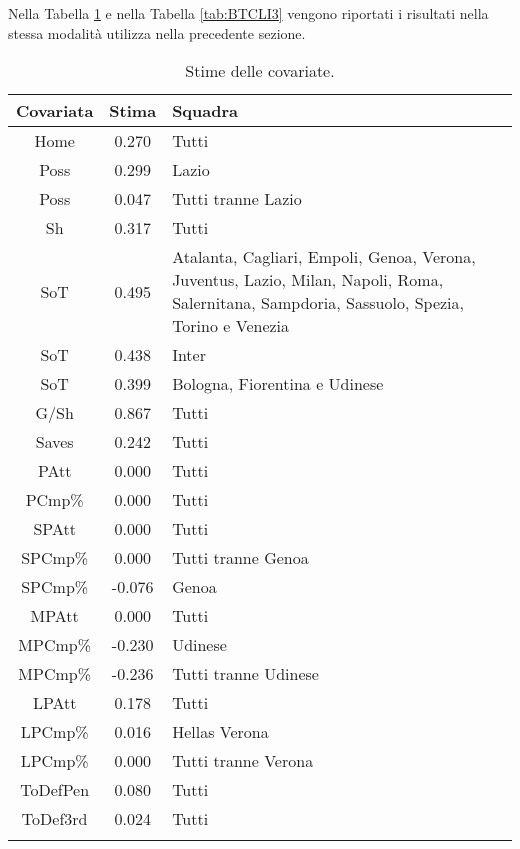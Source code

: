 Nella Tabella \ref{tab:BTCLI2} e nella Tabella \ref{tab:BTCLI3} vengono riportati i risultati nella stessa modalità utilizza nella precedente sezione.
\begin{table}[]%
	
	\renewcommand{\arraystretch}{1.7}
	\centering
	\begin{tabular}{ccp{10cm}}
		\hline	
		
		\textbf{Covariata} & \textbf{Stima} & \textbf{Squadra} \\	
		\hline
		Home & 0.270 & Tutti\\
		Poss & 0.299 & Lazio \\
		Poss & 0.047 & Tutti tranne Lazio\\
		Sh & 0.317 & Tutti \\
		SoT & 0.495 & Atalanta, Cagliari, Empoli, Genoa, Verona, Juventus, Lazio, Milan, Napoli, Roma, Salernitana, Sampdoria, Sassuolo, Spezia, Torino e Venezia\\
		SoT & 0.438 & Inter\\
		SoT & 0.399 & Bologna, Fiorentina e Udinese \\
		G/Sh & 0.867 & Tutti \\
		Saves & 0.242 & Tutti \\
		PAtt & 0.000 & Tutti \\
		PCmp\% & 0.000 & Tutti \\
		SPAtt & 0.000 & Tutti \\
		SPCmp\% & 0.000 & Tutti tranne Genoa \\ 
		SPCmp\% & -0.076 & Genoa \\	
		MPAtt & 0.000 & Tutti \\ 
		MPCmp\% & -0.230 & Udinese \\
		MPCmp\% & -0.236 & Tutti tranne Udinese \\		
		LPAtt & 0.178 & Tutti \\
		LPCmp\% & 0.016 & Hellas Verona \\
		LPCmp\% & 0.000 & Tutti tranne Verona \\
		ToDefPen & 0.080 & Tutti \\      
		ToDef3rd & 0.024 & Tutti \\
		
		
		\hline
		& &  \\
		
	\end{tabular} \hbox{}
	\caption{Stime delle covariate.} \label{tab:BTCLI2} 
	
\end{table}

